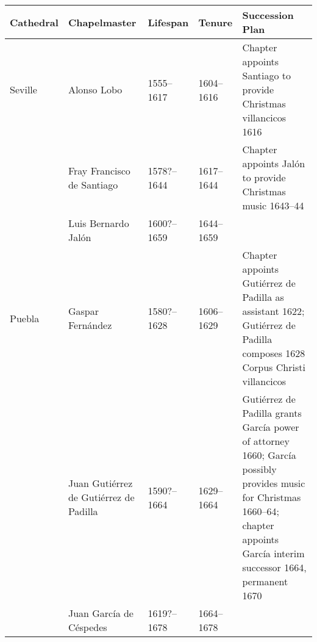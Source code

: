 \bgroup
\renewcommand{\arraystretch}{1.5}
\begin{tabulary}{\textwidth}{llllL}
    \toprule
    Cathedral & Chapelmaster & Lifespan & Tenure & Succession Plan\\
    \midrule

    Seville & Alonso Lobo & 1555--1617 & 1604--1616 
    & Chapter appoints Santiago to provide Christmas villancicos 1616\\

    & Fray Francisco de Santiago & 1578?--1644 & 1617--1644
    & Chapter appoints Jalón to provide Christmas music 1643--44\\

    & Luis Bernardo Jalón & 1600?--1659 & 1644--1659 & \\\midrule
    
    Puebla & Gaspar Fernández & 1580?--1628 & 1606--1629
    & Chapter appoints Gutiérrez de Padilla as assistant 1622; Gutiérrez de
    Padilla composes 1628 Corpus Christi villancicos\\

    & Juan Gutiérrez de Gutiérrez de Padilla & 1590?--1664 & 1629--1664 
    & Gutiérrez de Padilla grants García power of attorney 1660; García
    possibly provides music for Christmas 1660--64; chapter appoints García
    interim successor 1664, permanent 1670\\

    & Juan García de Céspedes & 1619?--1678 & 1664--1678 & \\
    \bottomrule
\end{tabulary}
\egroup
\endinput
